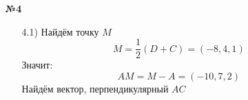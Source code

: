 \documentclass[a4paper]{article}
\renewcommand{\f}[2]{\frac{#1}{#2}}
\begin{document}
\begin{enumerate}
    \item[\textbf{№4}]\begin{enumerate}
        \item[4.1)] Найдём точку $M$
        $$M = \f{1}{2}(D+C) = (-8, 4, 1)$$
        Значит:
        $$AM = M - A = (-10, 7, 2)$$
        Найдём вектор, перпендикулярный $AC$

    \end{enumerate}


\end{enumerate}
\end{document}
